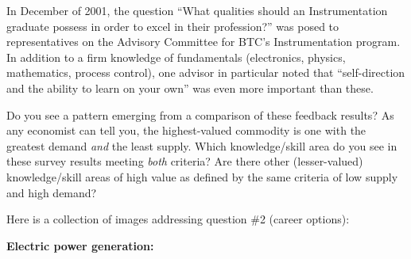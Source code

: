 \vskip 10pt


\filbreak

In December of 2001, the question ``What qualities should an Instrumentation graduate possess in order to excel in their profession?'' was posed to representatives on the Advisory Committee for BTC's Instrumentation program.  In addition to a firm knowledge of fundamentals (electronics, physics, mathematics, process control), one advisor in particular noted that ``self-direction and the ability to learn on your own'' was even more important than these.  

\vskip 10pt

Do you see a pattern emerging from a comparison of these feedback results?  As any economist can tell you, the highest-valued commodity is one with the greatest demand {\it and} the least supply.  Which knowledge/skill area do you see in these survey results meeting {\it both} criteria?  Are there other (lesser-valued) knowledge/skill areas of high value as defined by the same criteria of low supply and high demand?

\vskip 10pt






\filbreak

\noindent
Here is a collection of images addressing question \#2 (career options):

\vskip 10pt

\noindent
{\bf Electric power generation:}

